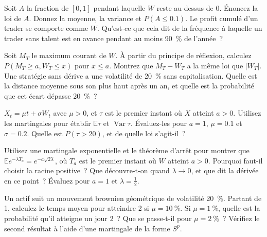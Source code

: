 \begin{question}\label{iq:iv1:stochastic-calculus:22}
Soit $A$ la fraction de $[0, 1]$ pendant laquelle $W$ reste au-dessus de 0. Énoncez la loi de $A$. Donnez la moyenne, la variance et $P(A \le 0.1)$. Le profit cumulé d'un trader se comporte comme $W$. Qu'est-ce que cela dit de la fréquence à laquelle un trader sans talent est en avance pendant au moins 90~\% de l'année~?
\end{question}

\begin{question}\label{iq:iv1:stochastic-calculus:23}
Soit $M_T$ le maximum courant de $W$. À partir du principe de réflexion, calculez $P(M_T \ge a, W_T \le x)$ pour $x \le a$. Montrez que $M_T - W_T$ a la même loi que $|W_T|$. Une stratégie sans dérive a une volatilité de 20~\% sans capitalisation. Quelle est la distance moyenne sous son plus haut après un an, et quelle est la probabilité que cet écart dépasse 20~\%~?
\end{question}

\begin{question}\label{iq:iv1:stochastic-calculus:24}
$X_t = \mu t + \sigma W_t$ avec $\mu > 0$, et $\tau$ est le premier instant où $X$ atteint $a > 0$. Utilisez les martingales pour établir $\mathbb{E}\tau$ et $\operatorname{Var}\tau$. Évaluez-les pour $a = 1$, $\mu = 0.1$ et $\sigma = 0.2$. Quelle est $P(\tau > 20)$, et de quelle loi s'agit-il~?
\end{question}

\begin{question}\label{iq:iv1:stochastic-calculus:25}
Utilisez une martingale exponentielle et le théorème d'arrêt pour montrer que $\mathbb{E}e^{-\lambda T_a} = e^{-a\sqrt{2\lambda}}$, où $T_a$ est le premier instant où $W$ atteint $a > 0$. Pourquoi faut-il choisir la racine positive~? Que découvre-t-on quand $\lambda \to 0$, et que dit la dérivée en ce point~? Évaluez pour $a = 1$ et $\lambda = \frac12$.
\end{question}

\begin{question}\label{iq:iv1:stochastic-calculus:26}
Un actif suit un mouvement brownien géométrique de volatilité 20~\%. Partant de 1, calculez le temps moyen pour atteindre 2 si $\mu = 10~\%$. Si $\mu = 1~\%$, quelle est la probabilité qu'il atteigne un jour 2~? Que se passe-t-il pour $\mu = 2~\%$~? Vérifiez le second résultat à l'aide d'une martingale de la forme $S^p$.
\end{question}

